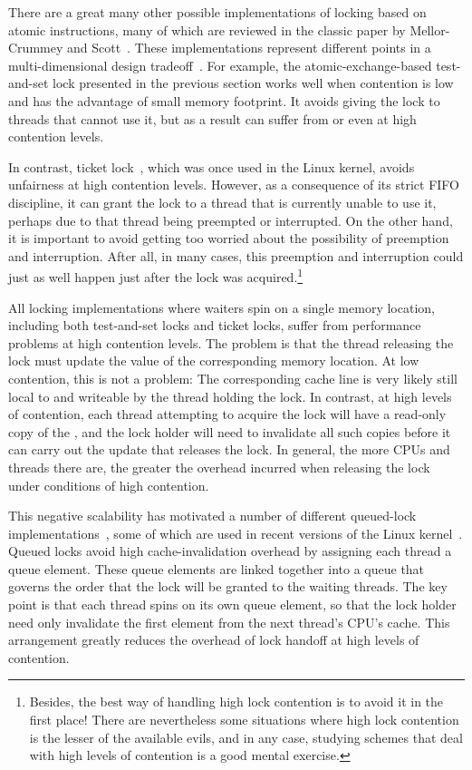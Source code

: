 There are a great many other possible implementations of locking based
on atomic instructions, many of which are reviewed in the classic paper
by Mellor-Crummey and Scott~\cite{MellorCrummey91a}.
These implementations represent different points in a multi-dimensional
design tradeoff~\cite{Guerraoui:2019:LPA:3319851.3301501,HugoGuirouxPhD,McKenney96a}.
For example,
the atomic-exchange-based test-and-set lock presented in the previous
section works well when contention is low and has the advantage
of small memory footprint.
It avoids giving the lock to threads that cannot use it, but as
a result can suffer from  or even  at high
contention levels.

In contrast, ticket lock~\cite{MellorCrummey91a}, which was once used
in the Linux kernel, avoids unfairness at high contention levels.
However, as a consequence of its strict FIFO discipline, it can grant
the lock to a thread that is currently unable to use it, perhaps due
to that thread being preempted or interrupted.
On the other hand, it is important to avoid getting too worried about the
possibility of preemption and interruption.
After all, in many cases, this preemption and interruption could just
as well happen just after the lock was
acquired.\footnote{
	Besides, the best way of handling high lock contention is to avoid
	it in the first place!
	There are nevertheless some situations where high lock contention
	is the lesser of the available evils, and in any case, studying
	schemes that deal with high levels of contention is a good mental
	exercise.}

All locking implementations where waiters spin on a single memory
location, including both test-and-set locks and ticket locks,
suffer from performance problems at high contention levels.
The problem is that the thread releasing the lock must update the
value of the corresponding memory location.
At low contention, this is not a problem:
The corresponding cache line is very likely still local to and
writeable by the thread holding the lock.
In contrast, at high levels of contention, each thread attempting to
acquire the lock will have a read-only copy of the , and
the lock holder will need to invalidate all such copies before it
can carry out the update that releases the lock.
In general, the more CPUs and threads there are, the greater the
overhead incurred when releasing the lock under conditions of
high contention.

This negative scalability has motivated a number of different
queued-lock
implementations~\cite{Anderson90,Graunke90,MellorCrummey91a,Wisniewski94,Craig93,Magnusson94,Takada93},
some of which are used in recent versions of the Linux
kernel~\cite{JonathanCorbet2014qspinlocks}.
Queued locks avoid high cache-invalidation overhead by assigning each
thread a queue element.
These queue elements are linked together into a queue that governs the
order that the lock will be granted to the waiting threads.
The key point is that each thread spins on its own queue element,
so that the lock holder need only invalidate the first element from
the next thread's CPU's cache.
This arrangement greatly reduces the overhead of lock handoff at high
levels of contention.

